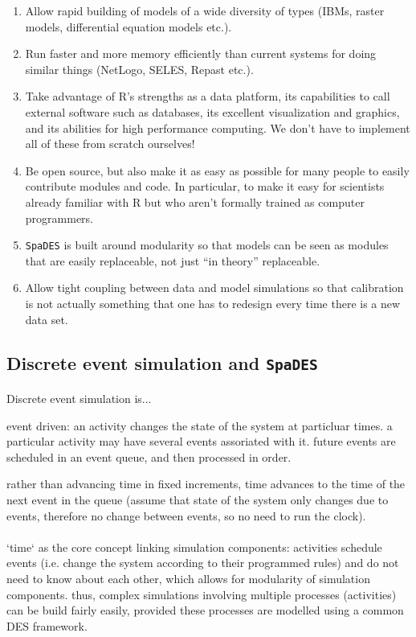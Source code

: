 \documentclass{article}
\begin{document}
\begin{enumerate}
  \item Allow rapid building of models of a wide diversity of types (IBMs, raster models, differential equation models etc.).
  \item Run faster and more memory efficiently than current systems for doing similar things (NetLogo, SELES, Repast etc.).
  \item Take advantage of R's strengths as a data platform, its capabilities to call external software such as databases, its excellent visualization and graphics, and its abilities for high performance computing. We don't have to implement all of these from scratch ourselves!
  \item Be open source, but also make it as easy as possible for many people to easily contribute modules and code. In particular, to make it easy for scientists already familiar with R but who aren't formally trained as computer programmers.
  \item \texttt{SpaDES} is built around modularity so that models can be seen as modules that are easily replaceable, not just ``in theory'' replaceable.
  \item Allow tight coupling between data and model simulations so that calibration is not actually something that one has to redesign every time there is a new data set.
\end{enumerate}

\subsection{Discrete event simulation and \texttt{SpaDES}}

\paragraph{}
Discrete event simulation is...

event driven: an activity changes the state of the system at particluar times. a particular activity may have several events assoriated with it. future events are scheduled in an event queue, and then processed in order.

rather than advancing time in fixed increments, time advances to the time of the next event in the queue (assume that state of the system only changes due to events, therefore no change between events, so no need to run the clock).

\paragraph{}
`time` as the core concept linking simulation components: activities schedule events (i.e. change the system according to their programmed rules) and do not need to know about each other, which allows for modularity of simulation components. thus, complex simulations involving multiple processes (activities) can be build fairly easily, provided these processes are modelled using a common DES framework.
\end{document}
